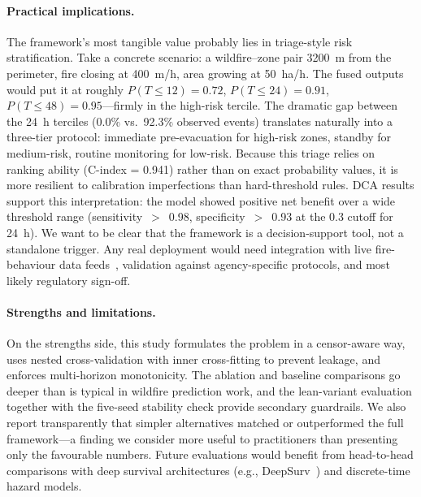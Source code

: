 \documentclass[fire,article,submit,pdftex]{../Definitions/mdpi}
\begin{document}
\paragraph{Practical implications.}
The framework's most tangible value probably lies in triage-style risk stratification.
Take a concrete scenario: a wildfire--zone pair 3200~m from the perimeter, fire closing at 400~m/h, area growing at 50~ha/h. The fused outputs would put it at roughly $P(T \leq 12) = 0.72$, $P(T \leq 24) = 0.91$, $P(T \leq 48) = 0.95$---firmly in the high-risk tercile.
The dramatic gap between the 24~h terciles (0.0\% vs.\ 92.3\% observed events) translates naturally into a three-tier protocol: immediate pre-evacuation for high-risk zones, standby for medium-risk, routine monitoring for low-risk. Because this triage relies on ranking ability (C-index = 0.941) rather than on exact probability values, it is more resilient to calibration imperfections than hard-threshold rules.
DCA results support this interpretation: the model showed positive net benefit over a wide threshold range (sensitivity~$>$~0.98, specificity~$>$~0.93 at the 0.3 cutoff for 24~h).
We want to be clear that the framework is a decision-support tool, not a standalone trigger. Any real deployment would need integration with live fire-behaviour data feeds~\cite{Radeloff2023}, validation against agency-specific protocols, and most likely regulatory sign-off.

\paragraph{Strengths and limitations.}
On the strengths side, this study formulates the problem in a censor-aware way, uses nested cross-validation with inner cross-fitting to prevent leakage, and enforces multi-horizon monotonicity. The ablation and baseline comparisons go deeper than is typical in wildfire prediction work, and the lean-variant evaluation together with the five-seed stability check provide secondary guardrails. We also report transparently that simpler alternatives matched or outperformed the full framework---a finding we consider more useful to practitioners than presenting only the favourable numbers.
Future evaluations would benefit from head-to-head comparisons with deep survival architectures (e.g., DeepSurv~\cite{Katzman2018}) and discrete-time hazard models.
\end{document}
